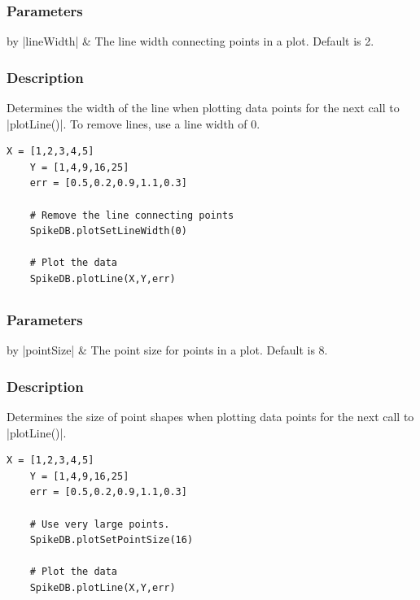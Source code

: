 \documentclass{report}
\begin{document}
\subsubsection{Parameters}
\begin{table}[h]
\begin{center}
\begin{tabular}{by}
		|lineWidth| & The line width connecting points in a plot. Default is 2.\\ 
	\end{tabular}
\end{center}
\end{table}
\subsubsection{Description}
Determines the width of the line when plotting data points for the next call to |plotLine()|. To remove lines, use a line width of 0.
\begin{lstlisting}[caption=Example]
	X = [1,2,3,4,5]
	Y = [1,4,9,16,25]
	err = [0.5,0.2,0.9,1.1,0.3]

	# Remove the line connecting points
	SpikeDB.plotSetLineWidth(0)

	# Plot the data
	SpikeDB.plotLine(X,Y,err)
\end{lstlisting}


\clearpage
\subsection[\method{void}{plotSetPointSize}]{}
\subsubsection{Parameters}
\begin{table}[h]
\begin{center}
\begin{tabular}{by}
		|pointSize| & The point size for points in a plot. Default is 8.\\ 
	\end{tabular}
\end{center}
\end{table}
\subsubsection{Description}
Determines the size of point shapes when plotting data points for the next call to |plotLine()|. 
\begin{lstlisting}[caption=Example]
	X = [1,2,3,4,5]
	Y = [1,4,9,16,25]
	err = [0.5,0.2,0.9,1.1,0.3]

	# Use very large points.
	SpikeDB.plotSetPointSize(16)

	# Plot the data
	SpikeDB.plotLine(X,Y,err)
\end{lstlisting}
\end{document}
